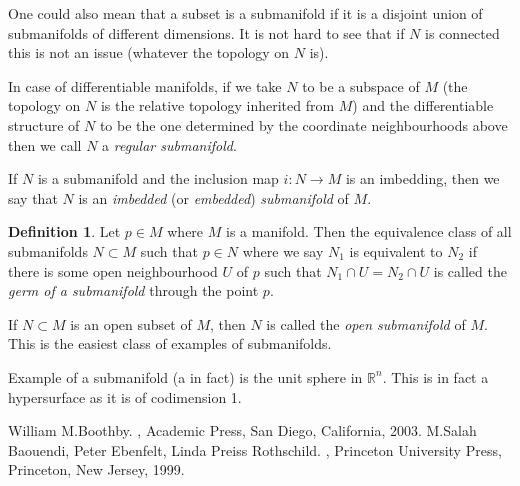 \documentclass[12pt]{article}
\theoremstyle{theorem}
\theoremstyle{definition}
\newtheorem*{defn}{Definition}
\theoremstyle{remark}
\begin{document}
One could also mean that a subset is a submanifold if it is a disjoint
union of submanifolds of different dimensions.  It is not hard to see that
if $N$ is connected this is not an issue (whatever the topology on $N$ is).

In case of differentiable manifolds,
if we take $N$ to be a subspace of $M$ (the topology on $N$ is the relative topology inherited from $M$) and the differentiable structure of $N$ to
be the one determined by
the coordinate neighbourhoods above then we call $N$ a {\em regular submanifold}.

If $N$ is a submanifold and the inclusion map $i \colon N \to M$ is an imbedding, then we
say that $N$ is an {\em imbedded} (or {\em embedded}) {\em submanifold} of $M$.

\begin{defn}
Let $p \in M$ where $M$ is a manifold.  Then the equivalence class of all
submanifolds $N \subset M$ such that $p \in N$ where we say $N_1$ is
equivalent to $N_2$ if there is some open neighbourhood $U$ of $p$ such
that $N_1 \cap U = N_2 \cap U$ is called the {\em germ of a submanifold} through the point $p$.
\end{defn}

If $N \subset M$ is an open subset of $M$, then $N$ is called the {\em open submanifold} of $M$.  This is the easiest class of examples of submanifolds.

Example of a submanifold (a  in fact) is the unit sphere in ${\mathbb{R}}^n$.  This is in fact a hypersurface
as it is of codimension 1.

\begin{thebibliography}{9}
William M.\@ Boothby.
{\em {}},
Academic Press, San Diego, California, 2003.
M.\@ Salah Baouendi,
Peter Ebenfelt,
Linda Preiss Rothschild.
{\em {}},
Princeton University Press,
Princeton, New Jersey, 1999.
\end{thebibliography}
\end{document}
